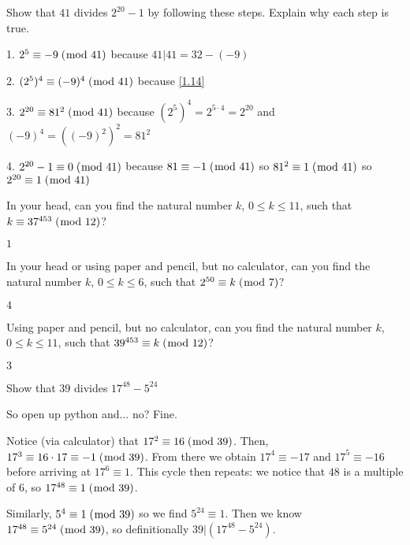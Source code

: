\documentclass[../main.tex]{subfiles}
\begin{document}
\begin{ex} \label{3.1}
  Show that $41$ divides $2^{20} - 1$ by following these steps. Explain why each step is true.
\end{ex}

1. $2^5 \equiv -9 \; (\bmod \; 41)$ because $41 | 41 = 32 - (-9)$

2. $(2^5)^4 \equiv (-9)^4 \; (\bmod \; 41)$ because \ref{1.14}

3. $2^{20} \equiv 81^2 \; (\bmod \; 41)$ because $(2^5)^4 = 2^{5 \cdot 4} = 2^{20}$ and $(-9)^4 = ((-9)^2)^2 = 81^2$

4. $2^{20} - 1 \equiv 0 \; (\bmod \; 41)$ because $81 \equiv -1 \; (\bmod \; 41)$ so $81^2 \equiv 1 \; (\bmod \; 41)$ so $2^{20} \equiv 1 \; (\bmod \; 41)$



\begin{ques} \label{3.2}
  In your head, can you find the natural number $k$, $0 \leq k \leq 11$, such that $k \equiv 37^{453} \; (\bmod \; 12)$?
\end{ques}

$1$



\begin{ques} \label{3.3}
  In your head or using paper and pencil, but no calculator, can you find the natural number $k$, $0 \leq k \leq 6$, such that $2^{50} \equiv k \; (\bmod \; 7)$?
\end{ques}

$4$



\begin{ques} \label{3.4}
  Using paper and pencil, but no calculator, can you find the natural number $k$, $0 \leq k \leq 11$, such that $39^{453} \equiv k \; (\bmod \; 12)$?
\end{ques}

$3$



\begin{ex} \label{3.5}
  Show that $39$ divides $17^{48} - 5^{24}$
\end{ex}

So open up python and... no? Fine.

Notice (via calculator) that $17^2 \equiv 16 \; (\bmod \; 39)$. Then, $17^3 \equiv 16 \cdot 17 \equiv -1 \; (\bmod \; 39)$. From there we obtain $17^4 \equiv -17$ and $17^5 \equiv -16$ before arriving at $17^6 \equiv 1$. This cycle then repeats: we notice that $48$ is a multiple of $6$, so $17^{48} \equiv 1 \; (\bmod \; 39)$.

Similarly, $5^4 \equiv 1 \; (\bmod \; 39)$ so we find $5^{24} \equiv 1$. Then we know $17^{48} \equiv 5^{24} \; (\bmod \; 39)$, so definitionally $39 | (17^{48} - 5^{24})$.
\end{document}
